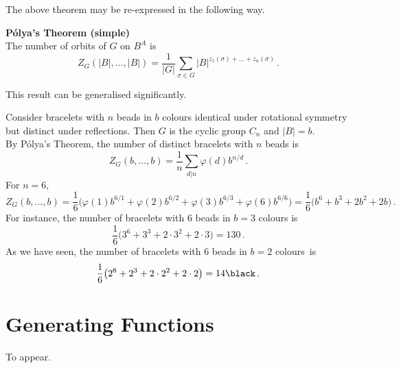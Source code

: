 \documentclass[a4paper]{article}
\newcommand{\example} {\bigskip\noindent{\bf Example.}\;\;}
\newenvironment{thm}[1]{
	\begin{framed}
	\noindent
	{\bfseries #1}\\}{\setlength{\itemsep}{0pt}
	\end{framed}
}
\begin{document}
The above theorem may be re-expressed in the following way.

\begin{thm}{P\'olya's Theorem (simple)}
	The number of orbits of $G$ on $B^A$ is
		\[ Z_G (|B|, \dots, |B|) = \frac{1}{|G|} \sum_{\sigma \in G} |B|^{z_1 (\sigma) + \dots + z_n (\sigma)}\,.\]
\end{thm}
This result can be generalised significantly.


\example
Consider bracelets with $n$ beads in $b$ colours
identical under rotational symmetry but distinct under reflections.
Then $G$ is the cyclic group $C_n$ and $|B|= b$.\\
By P\'olya's Theorem, the number of distinct bracelets with $n$ beads is
\[
  Z_G(b,\ldots,b) = \frac{1}{n} \sum_{d|n} \varphi(d) b^{n/d}\,.
\]
For $n= 6$,
  \[
      Z_G(b,\ldots,b)
    = \frac{1}{6} \bigl(\varphi(1) b^{6/1}+\varphi(2) b^{6/2}+\varphi(3) b^{6/3}+\varphi(6) b^{6/6}\bigr)
    = \frac{1}{6} \bigl(b^6 + b^3 + 2 b^{2} + 2b\bigr)\,.
  \]
For instance, the number of bracelets with $6$ beads in $b = 3$ colours is
  \[
    \frac{1}{6} \bigl(3^6 + 3^3 + 2\cdot3^{2} + 2\cdot3\bigr)
    = 130\,.\]
As we have seen, the number of bracelets with $6$ beads in $b = 2$ colours~is\vspace*{-2mm}
  \[\frac{1}{6} \bigl(2^6 + 2^3 + 2\cdot2^{2} + 2\cdot2\bigr)
    = 14\black\,.\]



\newpage
\section*{Generating Functions}

To appear.
\end{document}
